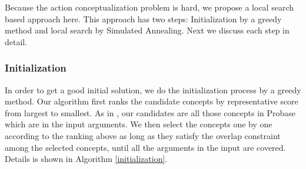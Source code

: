 Because the action conceptualization problem is hard, we propose a
local search based approach here.
This approach has two steps: Initialization by a greedy method and
local search by Simulated Annealing.
Next we discuss each step in detail.


\subsubsection{Initialization}
In order to get a good initial solution, we do the initialization process by a greedy method. Our algorithm first ranks the candidate concepts by representative score from largest to smallest. As in ,
our candidates are all those concepts in Probase which are in the
input arguments.   
We then select the concepts one by one according to the ranking above
as long as they satisfy the overlap constraint among the selected 
concepts, until all the arguments in the input are covered. 
Details is shown in Algorithm \ref{initialization}.
